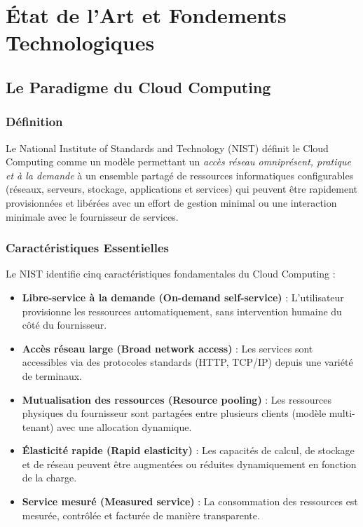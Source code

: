 \documentclass[12pt,a4paper,oneside]{book}
\begin{document}
\chapter{\'Etat de l'Art et Fondements Technologiques}

\section{Le Paradigme du Cloud Computing}

\subsection{D\'efinition}
Le National Institute of Standards and Technology (NIST) d\'efinit le Cloud Computing comme un mod\`ele permettant un \textit{acc\`es r\'eseau omnipr\'esent, pratique et \`a la demande} \`a un ensemble partag\'e de ressources informatiques configurables (r\'eseaux, serveurs, stockage, applications et services) qui peuvent \^etre rapidement provisionn\'ees et lib\'er\'ees avec un effort de gestion minimal ou une interaction minimale avec le fournisseur de services.

\subsection{Caract\'eristiques Essentielles}
Le NIST identifie cinq caract\'eristiques fondamentales du Cloud Computing :
\begin{itemize}
    \item \textbf{Libre-service \`a la demande (On-demand self-service)} : L'utilisateur provisionne les ressources automatiquement, sans intervention humaine du c\^ot\'e du fournisseur.
    \item \textbf{Acc\`es r\'eseau large (Broad network access)} : Les services sont accessibles via des protocoles standards (HTTP, TCP/IP) depuis une vari\'et\'e de terminaux.
    \item \textbf{Mutualisation des ressources (Resource pooling)} : Les ressources physiques du fournisseur sont partag\'ees entre plusieurs clients (mod\`ele multi-tenant) avec une allocation dynamique.
    \item \textbf{\'Elasticit\'e rapide (Rapid elasticity)} : Les capacit\'es de calcul, de stockage et de r\'eseau peuvent \^etre augment\'ees ou r\'eduites dynamiquement en fonction de la charge.
    \item \textbf{Service mesur\'e (Measured service)} : La consommation des ressources est mesur\'ee, contr\^ol\'ee et factur\'ee de mani\`ere transparente.
\end{itemize}
\end{document}
